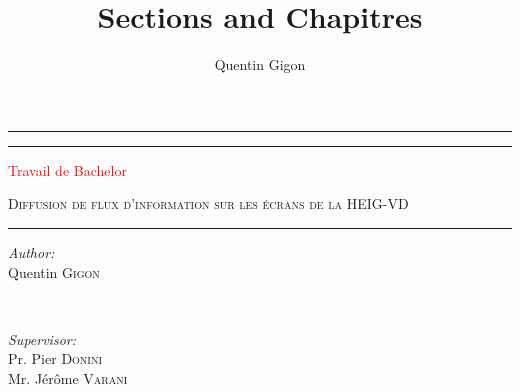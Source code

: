 \documentclass[french]{article}
\title{Sections and Chapitres}
\author{Quentin Gigon}
\date{ }
\begin{document}
\begin{titlepage} %
	
	\centering %
	
	
	\rule{\textwidth}{1pt} %
	
	\vspace{2pt}\vspace{-\baselineskip} %
	
	\rule{\textwidth}{0.4pt} %
	
	\vspace{0.1\textheight} %
	
	
	\textcolor{Red}{ %
		{\Huge Travail de Bachelor}\\[0.5\baselineskip] %
	}

	\textsc{\LARGE Diffusion de flux d'information sur les écrans de la HEIG-VD}\\[1.5cm] %

	
	\vspace{0.025\textheight} %
	
	\rule{0.3\textwidth}{0.4pt} %
	
	\vspace{0.1\textheight} %
	
	
\begin{minipage}{0.4\textwidth}
\begin{flushleft} \large
\emph{Author:}\\
Quentin \textsc{Gigon} %
\end{flushleft}
\end{minipage}
~
\begin{minipage}{0.4\textwidth}
\begin{flushright} \large
\emph{Supervisor:} \\
Pr. Pier \textsc{Donini}\\
Mr. Jérôme \textsc{Varani}
\end{flushright}
\end{minipage}\\[2cm]
	

\end{titlepage}
\end{document}
